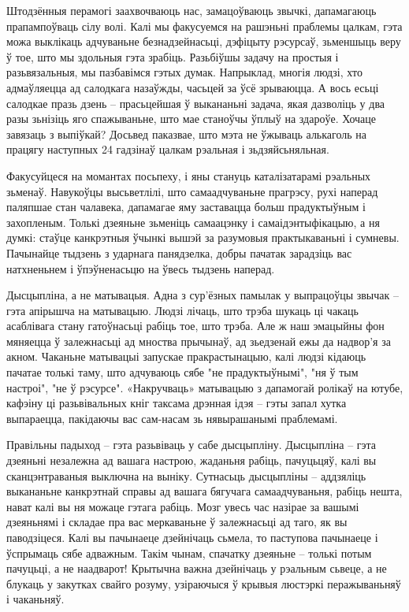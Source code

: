 Штодзённыя перамогі заахвочваюць нас, замацоўваюць звычкі, дапамагаюць прапампоўваць сілу волі. Калі мы факусуемся на рашэньні праблемы цалкам, гэта можа выклікаць адчуваньне безнадзейнасьці, дэфіцыту рэсурсаў, зьменшыць веру ў тое, што мы здольныя гэта зрабіць. Разьбіўшы задачу на простыя і разьвязальныя, мы пазбавімся гэтых думак. Напрыклад, многія людзі, хто адмаўляецца ад салодкага назаўжды, часьцей за ўсё зрываюцца. А вось есьці салодкае празь дзень – прасьцейшая ў выкананьні задача, якая дазволіць у два разы зьнізіць яго спажываньне, што мае станоўчы ўплыў на здароўе. Хочаце завязаць з выпіўкай? Досьвед паказвае, што мэта не ўжываць алькаголь на працягу наступных 24 гадзінаў цалкам рэальная і зьдзяйсьняльная.

Факусуйцеся на момантах посьпеху, і яны стануць каталізатарамі рэальных зьменаў. Навукоўцы высьветлілі, што самаадчуваньне прагрэсу, рухі наперад паляпшае стан чалавека, дапамагае яму заставацца больш прадуктыўным і захопленым. Толькі дзеяньне зьменіць самаацэнку і самаідэнтыфікацыю, а ня думкі: стаўце канкрэтныя ўчынкі вышэй за разумовыя практыкаваньні і сумневы. Пачынайце тыдзень з ударнага панядзелка, добры пачатак зарадзіць вас натхненьнем і ўпэўненасьцю на ўвесь тыдзень наперад.

Дысцыпліна, а не матывацыя. Адна з сур'ёзных памылак у выпрацоўцы звычак – гэта апірышча на матывацыю. Людзі лічаць, што трэба шукаць ці чакаць асаблівага стану гатоўнасьці рабіць тое, што трэба. Але ж наш эмацыйны фон мяняецца ў залежнасьці ад мноства прычынаў, ад зьедзенай ежы да надвор'я за акном. Чаканьне матывацыі запускае пракрастынацыю, калі людзі кідаюць пачатае толькі таму, што адчуваюць сябе "не прадуктыўнымі", "ня ў тым настроі", "не ў рэсурсе". «Накручваць» матывацыю з дапамогай ролікаў на ютубе, кафэіну ці разьвівальных кніг таксама дрэнная ідэя – гэты запал хутка выпараецца, пакідаючы вас сам-насам зь нявырашанымі праблемамі.

Правільны падыход – гэта разьвіваць у сабе дысцыпліну. Дысцыпліна – гэта дзеяньні незалежна ад вашага настрою, жаданьня рабіць, пачуцьцяў, калі вы сканцэнтраваныя выключна на выніку. Сутнасьць дысцыпліны – аддзяліць выкананьне канкрэтнай справы ад вашага бягучага самаадчуваньня, рабіць нешта, нават калі вы ня можаце гэтага рабіць. Мозг увесь час назірае за вашымі дзеяньнямі і складае пра вас меркаваньне ў залежнасьці ад таго, як вы паводзіцеся. Калі вы пачынаеце дзейнічаць сьмела, то паступова пачынаеце і ўспрымаць сябе адважным. Такім чынам, спачатку дзеяньне – толькі потым пачуцьці, а не наадварот! Крытычна важна дзейнічаць у рэальным сьвеце, а не блукаць у закутках свайго розуму, узіраючыся ў крывыя люстэркі перажываньняў і чаканьняў. 

